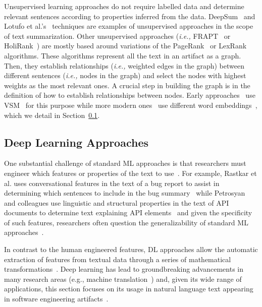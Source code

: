 Unsupervised learning approaches do not require labelled data and determine 
relevant sentences according to properties inferred from the data. 
DeepSum~\cite{Li2018} and Lotufo et al.'s~\cite{Lotufo2012} techniques are examples of 
unsupervised approaches in the scope of text summarization. Other unsupervised approaches 
(\textit{i.e.,} {\small FRAPT}~\cite{Jiang2017} or HoliRank~\cite{Ponzanelli2015, Ponzanelli2017})
are mostly based around variations of the PageRank~\cite{Page1999} or LexRank~\cite{Erkan2004} algorithms. 
These algorithms represent all the text in an artifact as a graph.
Then, they establish relationships (\textit{i.e.,} weighted edges in the graph) 
between different sentences (\textit{i.e.,} nodes in the graph) 
and select the nodes with highest weights as the most relevant ones.
A crucial step in building the graph is in the definition of 
how to establish  relationships between nodes.
Early approaches~\cite{Lotufo2012, Jiang2017} 
use \ac{VSM}~\cite{Salton1975vsm} 
for this purpose while more modern ones~\cite{Huang2018, silva2019}
use different word embeddings~\cite{Mikolov2013, bojanowski2017FastText},
which we detail in Section~\ref{cp2:deep-learning}.










\subsection{Deep Learning Approaches}
\label{cp2:deep-learning}



One substantial challenge of standard \acf{ML}
approaches is that researchers must engineer which 
features or properties of the text to use~\cite{ferreira2021}.
For example, Rastkar et al. uses conversational features in 
the text of a bug report to assist in determining which sentences 
to include in the bug summary~\cite{Rastkar2010}
while Petrosyan and colleagues use 
linguistic and structural properties 
in the text of API documents to determine text 
explaining API elements~\cite{Petrosyan2015}
and given the specificity of such features, 
researchers often question the generalizability
of standard \acs{ML} approaches~\cite{Xiao2018, fucci2019}.



In contrast to the human engineered features,
\acf{DL} approaches allow the automatic extraction of features 
from textual data through a series of mathematical transformations~\cite{Deng2018, zhang2021deep}.
Deep learning has lead to groundbreaking advancements in many 
research areas (e.g., machine translation~\cite{lopez2008translation}) 
and, given its wide range of applications, this section
focuses on its usage in natural language text appearing in software engineering artifacts~\cite{ferreira2021, li2018deep, sharafi2015}.



